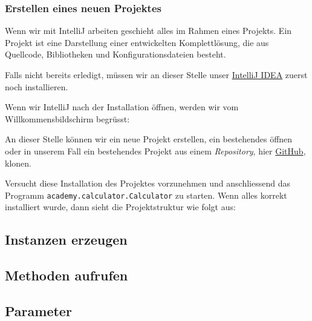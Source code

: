 \begin{Exercise}[%
title={Ein einfacher Taschenrechner},
label={ex:calculator}]

    \subsubsection*{Erstellen eines neuen Projektes}

    Wenn wir mit IntelliJ arbeiten geschieht alles im Rahmen eines Projekts.
    Ein Projekt ist eine Darstellung einer entwickelten Komplettlösung, die
    aus Quellcode, Bibliotheken und Konfigurationsdateien besteht.

    Falls nicht bereits erledigt, müssen wir an dieser Stelle unser
    \href{https://www.jetbrains.com/idea}{IntelliJ IDEA} zuerst noch installieren.

    Wenn wir IntelliJ nach der Installation öffnen, werden wir vom
    Willkommensbildschirm begrüsst:


    An dieser Stelle können wir ein neue Projekt erstellen, ein bestehendes öffnen
    oder in unserem Fall ein bestehendes Projekt aus einem \emph{Repository}, hier
    \href{https://github.com/dsenften/example-simple-calculator.git}{GitHub},
    klonen.

    Versucht diese Installation des Projektes vorzunehmen und anschliessend
    das Programm \texttt{academy.calculator.Calculator} zu starten. Wenn alles
    korrekt installiert wurde, dann sieht die Projektstruktur wie folgt aus:


\end{Exercise}


\subsection{Instanzen erzeugen}
\label{subsec:create-instance}

\subsection{Methoden aufrufen}
\label{subsec:call-method}

\subsection{Parameter}
\label{subsec:parameter}

